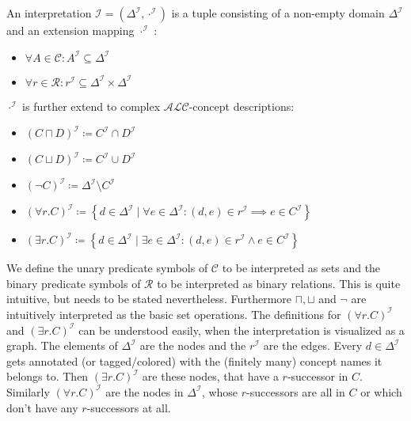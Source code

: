 \begin{definition}
	An interpretation $\mathcal{I} = (\Delta^{\mathcal{I}}, \cdot^{\mathcal{I}})$ is a tuple consisting of 
	a non-empty domain $\Delta^{\mathcal{I}}$ and
	an extension mapping $\cdot^{\mathcal{I}}$ :
	\begin{itemize}
		\item $\forall A \in \mathscr{C} : A^{\mathcal{I}} \subseteq \Delta^{\mathcal{I}}$
		\item $\forall r \in \mathscr{R} : r^{\mathcal{I}}\subseteq \Delta^{\mathcal{I}} \times \Delta^{\mathcal{I}}$
	\end{itemize}
	$\cdot^{\mathcal{I}}$ is further extend to complex $\mathcal{ALC}$-concept descriptions:
	\begin{itemize}
		\item $\left( C \sqcap D \right) ^{\mathcal{I}} \coloneqq C^{\mathcal{I}} \cap D^{\mathcal{I}}$
		\item $\left( C \sqcup D \right)^{\mathcal{I}} \coloneqq C^{\mathcal{I}} \cup D^{\mathcal{I}}$
		\item $\left( \neg C \right) ^{\mathcal{I}} \coloneqq \Delta ^{\mathcal{I}} \setminus C^{\mathcal{I}}$
		\item $\left( \forall r.C \right)^{\mathcal{I}} \coloneqq \left\{ d \in \Delta^{\mathcal{I}} \mid \forall e \in \Delta^{\mathcal{I}}: (d,e) \in r^{\mathcal{I}} \implies e \in C^{\mathcal{I}} \right\} $
		\item $\left( \exists r.C \right)^{\mathcal{I}} \coloneqq \left\{ d \in \Delta^{\mathcal{I}} \mid \exists e \in \Delta^{\mathcal{I}}: (d,e) \in r^{\mathcal{I}} \land e \in C^{\mathcal{I}} \right\} $
	\end{itemize}
\end{definition}
We define the unary predicate symbols of $\mathscr{C}$ to be interpreted as sets
and the binary predicate symbols of $\mathscr{R}$ to be interpreted as binary relations.
This is quite intuitive, but needs to be stated nevertheless.
Furthermore $\sqcap, \sqcup$ and $\neg$ are intuitively interpreted as the basic set operations.
The definitions for $\left( \forall r.C \right)^{\mathcal{I}}$ and $\left( \exists r.C \right)^{\mathcal{I}}$
can be understood easily, when the interpretation is visualized as a graph.
The elements of $\Delta^{\mathcal{I}}$ are the nodes and the $r^{\mathcal{I}}$ are the edges.
Every $d \in \Delta^{\mathcal{I}}$ gets annotated (or tagged/colored) with the (finitely many) concept names it belongs to.
Then $\left( \exists r.C \right)^{\mathcal{I}}$ are these nodes, that have a $r$-successor in $C$.
Similarly $\left( \forall r.C \right)^{\mathcal{I}}$ are the nodes in $\Delta^{\mathcal{I}}$, whose $r$-successors are all in $C$
or which don't have any $r$-successors at all.

